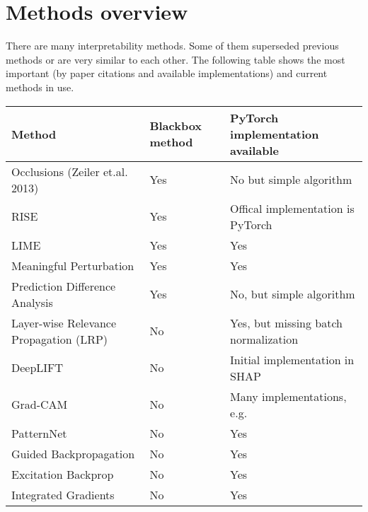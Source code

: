 \section{Methods overview}
There are many interpretability methods. Some of them superseded previous methods or are very similar to each other.
The following table shows the most important (by paper citations and available implementations) and current methods in use.

\begin{tabular}{| p{7cm} | p{2.5cm} | p{6cm} | }
\hline
\textbf{Method} & \textbf{Blackbox method} & \textbf{PyTorch implementation available} \\ \hline
Occlusions (Zeiler et.al. 2013) \cite{zeiler2014visualizing} & Yes & No but simple algorithm \\ \hline
RISE \cite{Petsiuk2018rise} & Yes & Offical implementation is PyTorch \\ \hline
LIME \cite{ribeiro2016should} & Yes & Yes \\ \hline
Meaningful Perturbation \cite{fong2017interpretable} & Yes & Yes \cite{fong2017implementation} \\ \hline
Prediction Difference Analysis \cite{zintgraf2017visualizing} & Yes & No, but simple algorithm \\ \hline
Layer-wise Relevance Propagation (LRP) \cite{bach2015pixel} & No & Yes, but missing batch normalization \cite{lrppytorch} \\ \hline
DeepLIFT \cite{shrikumar2017learning} & No & Initial implementation in SHAP \cite{NIPS2017_7062} \\ \hline
Grad-CAM \cite{selvaraju2017grad} & No & Many implementations, e.g. \cite{visualattribution} \\ \hline
PatternNet \cite{kindermans2017learning} & No & Yes \cite{visualattribution} \\ \hline
Guided Backpropagation \cite{springenberg2014striving}  & No & Yes \cite{visualattribution} \\ \hline
Excitation Backprop \cite{zhang2016EB} & No & Yes \cite{visualattribution} \\ \hline
Integrated Gradients \cite{sundararajan2017axiomatic} & No & Yes \cite{integratedgradientpytorch}  \\ \hline
\end{tabular}
